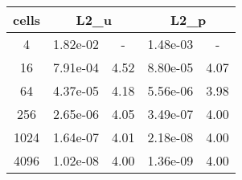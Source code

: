 \documentclass[10pt]{report}
\begin{document}
\begin{table}[H]
\begin{center}
\begin{tabular}{|c|c|c|c|c|} \hline
cells & 
\multicolumn{2}{|c|}{L2_u} & 
\multicolumn{2}{|c|}{L2_p}\\ \hline
4 & 1.82e-02 & - & 1.48e-03 & -\\ \hline
16 & 7.91e-04 & 4.52 & 8.80e-05 & 4.07\\ \hline
64 & 4.37e-05 & 4.18 & 5.56e-06 & 3.98\\ \hline
256 & 2.65e-06 & 4.05 & 3.49e-07 & 4.00\\ \hline
1024 & 1.64e-07 & 4.01 & 2.18e-08 & 4.00\\ \hline
4096 & 1.02e-08 & 4.00 & 1.36e-09 & 4.00\\ \hline
\end{tabular}
\end{center}
\end{table}
\end{document}
